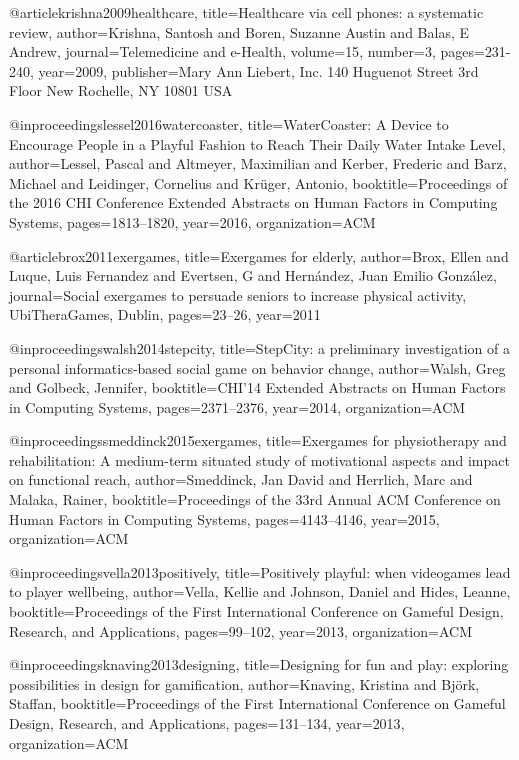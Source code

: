 @article{krishna2009healthcare,
  title={Healthcare via cell phones: a systematic review},
  author={Krishna, Santosh and Boren, Suzanne Austin and Balas, E Andrew},
  journal={Telemedicine and e-Health},
  volume={15},
  number={3},
  pages={231-240},
  year={2009},
  publisher={Mary Ann Liebert, Inc. 140 Huguenot Street 3rd Floor New Rochelle, NY 10801 USA}
}

@inproceedings{lessel2016watercoaster,
  title={WaterCoaster: A Device to Encourage People in a Playful Fashion to Reach Their Daily Water Intake Level},
  author={Lessel, Pascal and Altmeyer, Maximilian and Kerber, Frederic and Barz, Michael and Leidinger, Cornelius and Kr{\"u}ger, Antonio},
  booktitle={Proceedings of the 2016 CHI Conference Extended Abstracts on Human Factors in Computing Systems},
  pages={1813--1820},
  year={2016},
  organization={ACM}
}

@article{brox2011exergames,
  title={Exergames for elderly},
  author={Brox, Ellen and Luque, Luis Fernandez and Evertsen, G and Hern{\'a}ndez, Juan Emilio Gonz{\'a}lez},
  journal={Social exergames to persuade seniors to increase physical activity, UbiTheraGames, Dublin},
  pages={23--26},
  year={2011}
}

@inproceedings{walsh2014stepcity,
  title={StepCity: a preliminary investigation of a personal informatics-based social game on behavior change},
  author={Walsh, Greg and Golbeck, Jennifer},
  booktitle={CHI'14 Extended Abstracts on Human Factors in Computing Systems},
  pages={2371--2376},
  year={2014},
  organization={ACM}
}


@inproceedings{smeddinck2015exergames,
  title={Exergames for physiotherapy and rehabilitation: A medium-term situated study of motivational aspects and impact on functional reach},
  author={Smeddinck, Jan David and Herrlich, Marc and Malaka, Rainer},
  booktitle={Proceedings of the 33rd Annual ACM Conference on Human Factors in Computing Systems},
  pages={4143--4146},
  year={2015},
  organization={ACM}
}

@inproceedings{vella2013positively,
  title={Positively playful: when videogames lead to player wellbeing},
  author={Vella, Kellie and Johnson, Daniel and Hides, Leanne},
  booktitle={Proceedings of the First International Conference on Gameful Design, Research, and Applications},
  pages={99--102},
  year={2013},
  organization={ACM}
}


@inproceedings{knaving2013designing,
  title={Designing for fun and play: exploring possibilities in design for gamification},
  author={Knaving, Kristina and Bj{\"o}rk, Staffan},
  booktitle={Proceedings of the First International Conference on Gameful Design, Research, and Applications},
  pages={131--134},
  year={2013},
  organization={ACM}
}

